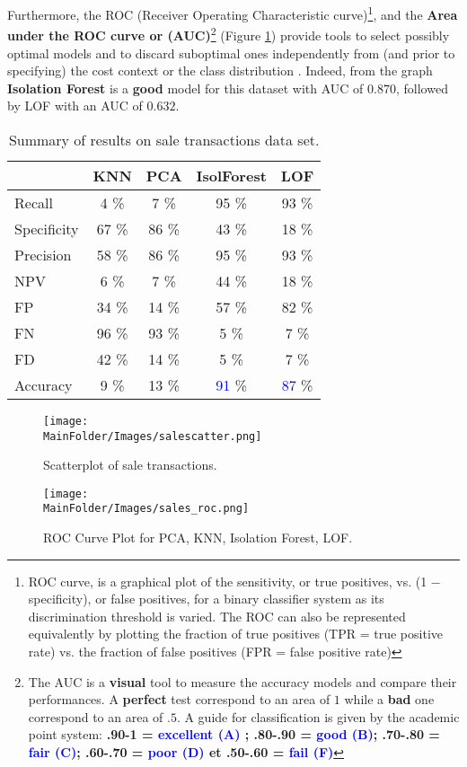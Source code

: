 Furthermore, the ROC (Receiver Operating Characteristic curve)\footnote{ROC curve, is a graphical plot of the sensitivity, or true positives, vs. (1 − specificity), or false positives, for a binary classifier system as its discrimination threshold is varied. The ROC can also be represented equivalently by plotting the fraction of true positives (TPR = true positive rate) vs. the fraction of false positives (FPR = false positive rate)}, and the \textbf{Area under the ROC curve or (AUC)}\footnote{ The AUC is a \textbf{visual} tool to measure the accuracy models and compare their performances. A \textbf{perfect} test correspond to an area of $1$ while a \textbf{bad} one correspond to an area of $.5$. A guide for classification is given by the academic point system: \textbf{
.90-1 = \textcolor{blue}{excellent (A)} ; .80-.90 = \textcolor{blue}{good (B)}; .70-.80 = \textcolor{blue}{fair (C)}; .60-.70 = \textcolor{blue}{poor (D)} et .50-.60 = \textcolor{blue}{fail (F)}}} (Figure \ref{fig_sal14})  provide tools to select possibly optimal models and to discard suboptimal ones independently from (and prior to specifying) the cost context or the class distribution \cite{ROC}. Indeed, from the graph \textbf{Isolation Forest} is a \textbf{good} model for this dataset with  AUC of $0.870$, followed by LOF with an AUC of $0.632$.
\begin{table}[H]
\centering
 \begin{tabular}{||l c c c c||} 
 \hline
 &  KNN & PCA & IsolForest & LOF\\ [0.5ex] 
 \hline\hline
Recall & 4 \% & 7 \%  & 95 \% & 93  \% \\ 
Specificity & 67 \% & 86 \%  & 43 \% & 18 \% \\
Precision & 58 \% & 86 \%  & 95 \% & 93 \% \\
NPV & 6 \% & 7 \%  & 44 \% & 18 \% \\
FP & 34 \% & 14 \%  & 57 \% & 82 \% \\
FN & 96 \% & 93 \%  & 5 \% & 7 \% \\
FD & 42 \% & 14 \%  & 5 \% & 7 \% \\
Accuracy & 9 \% & 13 \%  & \textcolor{blue}{91} \% & \textcolor{blue}{87} \% \\
[1ex] 
 \hline
 \end{tabular}
 \caption{Summary of results on sale transactions data set.}
 \label{fig_sale3}
\end{table}
\begin{figure}[H]
    \centering
    \texttt{[image: \\MainFolder/Images/salescatter.png]}
    \label{fig_sal11}
    \caption{Scatterplot of sale transactions.}%
     \texttt{[image: \\MainFolder/Images/sales\_roc.png]}
     \caption{ROC Curve Plot for PCA, KNN, Isolation Forest, LOF.}%
     \label{fig_sal14}
\end{figure}
